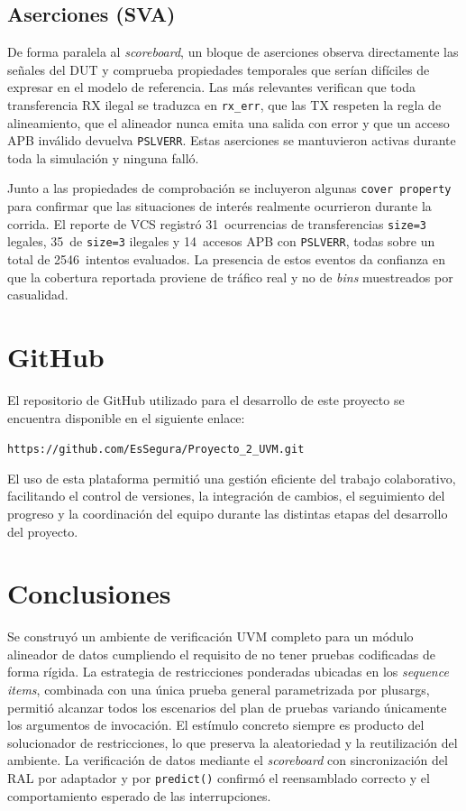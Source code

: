 \documentclass[conference]{IEEEtran}
\begin{document}
\subsection{Aserciones (SVA)}

De forma paralela al \textit{scoreboard}, un bloque de aserciones observa
directamente las señales del DUT y comprueba propiedades temporales que serían
difíciles de expresar en el modelo de referencia. Las más relevantes verifican
que toda transferencia RX ilegal se traduzca en \texttt{rx\_err}, que las TX
respeten la regla de alineamiento, que el alineador nunca emita una salida con
error y que un acceso APB inválido devuelva \texttt{PSLVERR}. Estas aserciones
se mantuvieron activas durante toda la simulación y ninguna falló.

Junto a las propiedades de comprobación se incluyeron algunas \texttt{cover
property} para confirmar que las situaciones de interés realmente ocurrieron
durante la corrida. El reporte de VCS registró 31~ocurrencias de transferencias
\texttt{size=3} legales, 35~de \texttt{size=3} ilegales y 14~accesos APB con
\texttt{PSLVERR}, todas sobre un total de 2546~intentos evaluados. La presencia
de estos eventos da confianza en que la cobertura reportada proviene de tráfico
real y no de \textit{bins} muestreados por casualidad.


\section{GitHub}

El repositorio de GitHub utilizado para el desarrollo de este proyecto se encuentra disponible en el siguiente enlace:

\begin{center}
\texttt{https://github.com/EsSegura/Proyecto\_2\_UVM.git}
\end{center}

El uso de esta plataforma permitió una gestión eficiente del trabajo colaborativo, facilitando el control de versiones, la integración de cambios, el seguimiento del progreso y la coordinación del equipo durante las distintas etapas del desarrollo del proyecto.


\section{Conclusiones}
Se construyó un ambiente de verificación UVM completo para un módulo alineador de
datos cumpliendo el requisito de no tener pruebas codificadas de forma rígida. La
estrategia de restricciones ponderadas ubicadas en los \textit{sequence items},
combinada con una única prueba general parametrizada por plusargs, permitió
alcanzar todos los escenarios del plan de pruebas variando únicamente los
argumentos de invocación. El estímulo concreto siempre es producto del
solucionador de restricciones, lo que preserva la aleatoriedad y la reutilización
del ambiente. La verificación de datos mediante el \textit{scoreboard} con
sincronización del RAL por adaptador y por \texttt{predict()} confirmó el
reensamblado correcto y el comportamiento esperado de las interrupciones.
\end{document}

